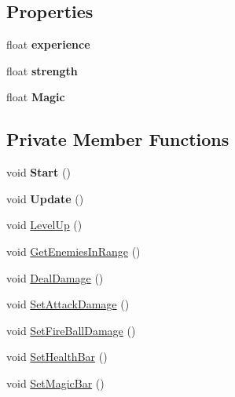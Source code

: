 \subsection*{Properties}
\begin{DoxyCompactItemize}
\item 
\mbox{\label{class_player_controller_afe1e7fc716edb5cc68277ffa51b98317}} 
float {\bfseries experience}
\item 
\mbox{\label{class_player_controller_ae2b5b5fe499e8c7f3ccfd06129b34b6e}} 
float {\bfseries strength}
\item 
\mbox{\label{class_player_controller_a150ddb21abcd8181cdd52ba0c728f938}} 
float {\bfseries Magic}
\end{DoxyCompactItemize}
\subsection*{Private Member Functions}
\begin{DoxyCompactItemize}
\item 
\mbox{\label{class_player_controller_ae1117d9c4da3193181cddad2c814e467}} 
void {\bfseries Start} ()
\item 
\mbox{\label{class_player_controller_ae8bc83dffb99867a04be016473ed2c43}} 
void {\bfseries Update} ()
\item 
void \hyperlink{class_player_controller_af6369eee5fe0a5ae1193a243b0163097}{Level\+Up} ()
\item 
void \hyperlink{class_player_controller_ac3fb6b8e30f4760b402a8f9bea566612}{Get\+Enemies\+In\+Range} ()
\item 
void \hyperlink{class_player_controller_a2fb25d919a6fbd760c65970976cfa372}{Deal\+Damage} ()
\item 
void \hyperlink{class_player_controller_ae0e3dd0ef44f9a50af9c884f56512b13}{Set\+Attack\+Damage} ()
\item 
void \hyperlink{class_player_controller_a6b4d0a4ab8c29eb7272c807d608c4f3a}{Set\+Fire\+Ball\+Damage} ()
\item 
void \hyperlink{class_player_controller_a386e094ad5ecd209ab743e74c7f9acb6}{Set\+Health\+Bar} ()
\item 
void \hyperlink{class_player_controller_a17fa240e3211d11288e6c116e0ab6fa3}{Set\+Magic\+Bar} ()
\end{DoxyCompactItemize}

